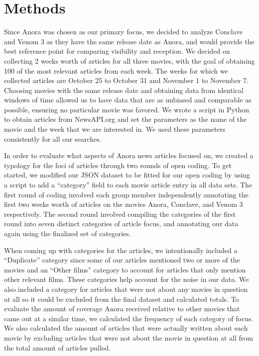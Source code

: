 \documentclass[letterpaper]{article} %
\begin{document}
\section{Methods}
Since Anora was chosen as our primary focus, we decided to analyze Conclave and Venom 3 as they have the same release date as Anora, and would provide the best reference point for comparing visibility and reception. We decided on collecting 2 weeks worth of articles for all three movies, with the goal of obtaining 100 of the most relevant articles from each week. The weeks for which we collected articles are October 25 to October 31 and November 1 to November 7. Choosing movies with the same release date and obtaining data from identical windows of time allowed us to have data that are as unbiased and comparable as possible, ensuring no particular movie was favored. We wrote a script in Python to obtain articles from NewsAPI.org and set the parameters as the name of the movie and the week that we are interested in. We used these parameters consistently for all our searches.

In order to evaluate what aspects of Anora news articles focused on, we created a typology for the foci of articles through two rounds of open coding. To get started, we modified our JSON dataset to be fitted for our open coding by using a script to add a “category” field to each movie article entry in all data sets. The first round of coding involved each group member independently annotating the first two weeks worth of articles on the movies Anora, Conclave, and Venom 3 respectively. The second round involved compiling the categories of the first round into seven distinct categories of article focus, and annotating our data again using the finalized set of categories. 

When coming up with categories for the articles, we intentionally included a “Duplicate” category since some of our articles mentioned two or more of the movies and an “Other films” category to account for articles that only mention other relevant films. These categories help account for the noise in our data. We also included a category for articles that were not about any movies in question at all so it could be excluded from the final dataset and calculated totals. To evaluate the amount of coverage Anora received relative to other movies that came out at a similar time, we calculated the frequency of each category of focus. We also calculated the amount of articles that were actually written about each movie by excluding articles that were not about the movie in question at all from the total amount of articles pulled. 
\end{document}
